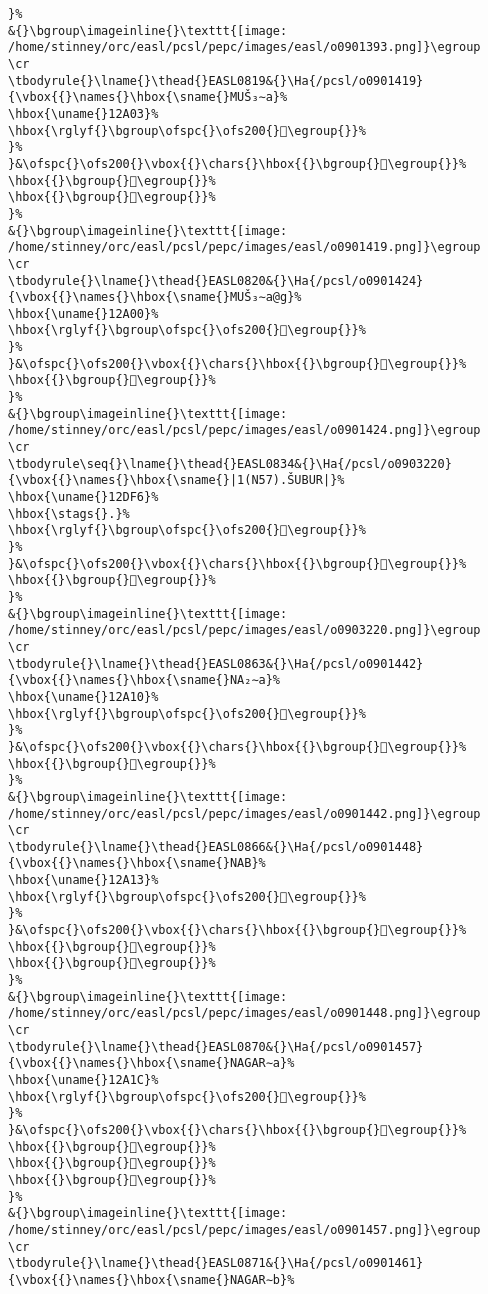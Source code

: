 \begin{verbatim}
}%
&{}\bgroup\imageinline{}\texttt{[image: /home/stinney/orc/easl/pcsl/pepc/images/easl/o0901393.png]}\egroup
\cr
\tbodyrule{}\lname{}\thead{}EASL0819&{}\Ha{/pcsl/o0901419}{\vbox{{}\names{}\hbox{\sname{}MUŠ₃∼a}%
\hbox{\uname{}12A03}%
\hbox{\rglyf{}\bgroup\ofspc{}\ofs200{}𒨃\egroup{}}%
}%
}&\ofspc{}\ofs200{}\vbox{{}\chars{}\hbox{{}\bgroup{}𒧿\egroup{}}%
\hbox{{}\bgroup{}𒨂\egroup{}}%
\hbox{{}\bgroup{}𒨃\egroup{}}%
}%
&{}\bgroup\imageinline{}\texttt{[image: /home/stinney/orc/easl/pcsl/pepc/images/easl/o0901419.png]}\egroup
\cr
\tbodyrule{}\lname{}\thead{}EASL0820&{}\Ha{/pcsl/o0901424}{\vbox{{}\names{}\hbox{\sname{}MUŠ₃∼a@g}%
\hbox{\uname{}12A00}%
\hbox{\rglyf{}\bgroup\ofspc{}\ofs200{}𒨀\egroup{}}%
}%
}&\ofspc{}\ofs200{}\vbox{{}\chars{}\hbox{{}\bgroup{}𒨀\egroup{}}%
\hbox{{}\bgroup{}𒨁\egroup{}}%
}%
&{}\bgroup\imageinline{}\texttt{[image: /home/stinney/orc/easl/pcsl/pepc/images/easl/o0901424.png]}\egroup
\cr
\tbodyrule\seq{}\lname{}\thead{}EASL0834&{}\Ha{/pcsl/o0903220}{\vbox{{}\names{}\hbox{\sname{}|1(N57).ŠUBUR|}%
\hbox{\uname{}12DF6}%
\hbox{\stags{}.}%
\hbox{\rglyf{}\bgroup\ofspc{}\ofs200{}𒷶\egroup{}}%
}%
}&\ofspc{}\ofs200{}\vbox{{}\chars{}\hbox{{}\bgroup{}𒷷\egroup{}}%
\hbox{{}\bgroup{}𒷶\egroup{}}%
}%
&{}\bgroup\imageinline{}\texttt{[image: /home/stinney/orc/easl/pcsl/pepc/images/easl/o0903220.png]}\egroup
\cr
\tbodyrule{}\lname{}\thead{}EASL0863&{}\Ha{/pcsl/o0901442}{\vbox{{}\names{}\hbox{\sname{}NA₂∼a}%
\hbox{\uname{}12A10}%
\hbox{\rglyf{}\bgroup\ofspc{}\ofs200{}𒨐\egroup{}}%
}%
}&\ofspc{}\ofs200{}\vbox{{}\chars{}\hbox{{}\bgroup{}𒨏\egroup{}}%
\hbox{{}\bgroup{}𒨐\egroup{}}%
}%
&{}\bgroup\imageinline{}\texttt{[image: /home/stinney/orc/easl/pcsl/pepc/images/easl/o0901442.png]}\egroup
\cr
\tbodyrule{}\lname{}\thead{}EASL0866&{}\Ha{/pcsl/o0901448}{\vbox{{}\names{}\hbox{\sname{}NAB}%
\hbox{\uname{}12A13}%
\hbox{\rglyf{}\bgroup\ofspc{}\ofs200{}𒨓\egroup{}}%
}%
}&\ofspc{}\ofs200{}\vbox{{}\chars{}\hbox{{}\bgroup{}𒨓\egroup{}}%
\hbox{{}\bgroup{}𒨔\egroup{}}%
\hbox{{}\bgroup{}𒨕\egroup{}}%
}%
&{}\bgroup\imageinline{}\texttt{[image: /home/stinney/orc/easl/pcsl/pepc/images/easl/o0901448.png]}\egroup
\cr
\tbodyrule{}\lname{}\thead{}EASL0870&{}\Ha{/pcsl/o0901457}{\vbox{{}\names{}\hbox{\sname{}NAGAR∼a}%
\hbox{\uname{}12A1C}%
\hbox{\rglyf{}\bgroup\ofspc{}\ofs200{}𒨜\egroup{}}%
}%
}&\ofspc{}\ofs200{}\vbox{{}\chars{}\hbox{{}\bgroup{}𒨙\egroup{}}%
\hbox{{}\bgroup{}𒨚\egroup{}}%
\hbox{{}\bgroup{}𒨛\egroup{}}%
\hbox{{}\bgroup{}𒨜\egroup{}}%
}%
&{}\bgroup\imageinline{}\texttt{[image: /home/stinney/orc/easl/pcsl/pepc/images/easl/o0901457.png]}\egroup
\cr
\tbodyrule{}\lname{}\thead{}EASL0871&{}\Ha{/pcsl/o0901461}{\vbox{{}\names{}\hbox{\sname{}NAGAR∼b}%

\end{verbatim}
